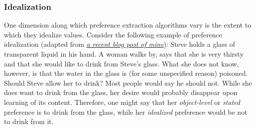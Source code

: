 \subsubsection{Idealization}\label{idealization}

One dimension along which preference extraction algorithms vary is the
extent to which they idealize values. Consider the following example of
preference idealization (adapted from
\href{https://casparoesterheld.com/2017/01/18/is-it-a-bias-or-just-a-preference-an-interesting-issue-in-preference-idealization/}{\emph{a
recent blog post of mine}}): Steve holds a glass of transparent liquid
in his hand. A woman walks by, says that she is very thirsty and that
she would like to drink from Steve's glass. What she does not know,
however, is that the water in the glass is (for some unspecified reason)
poisoned. Should Steve allow her to drink? Most people would say he
should not. While she does want to drink from the glass, her desire
would probably disappear upon learning of its content. Therefore, one
might say that her \emph{object-level} or \emph{stated} preference is to
drink from the glass, while her \emph{idealized} preference would be not
to drink from it.


